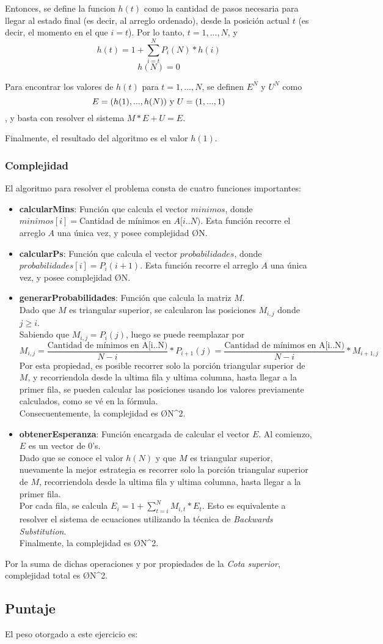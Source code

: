 Entonces, se define la funcion $h(t)$ como la cantidad de pasos necesaria para llegar al estado final (es decir, al arreglo ordenado), desde la posición actual $t$ (es decir, el momento en el que $i = t$). Por lo tanto, $t = 1,...,N$, y
\[ h(t) = 1 + \sum_{i = t}^{N} P_i(N)*h(i) \]
\[ h(N) = 0 \]

Para encontrar los valores de $h(t)$ para $t = 1,...,N$, se definen $E^N$ y $U^N$ como \[ E = (h(1),...,h(N))$ y $U = (1,...,1) \], y basta con resolver el sistema $M*E + U = E$.

Finalmente, el resultado del algoritmo es el valor $h(1)$.

\subsubsection{Complejidad}
El algoritmo para resolver el problema consta de cuatro funciones importantes:
\begin{itemize}
	\item \textbf{calcularMins}: Función que calcula el vector $minimos$, donde $minimos[i] = $Cantidad de mínimos en $A[i..N)$. Esta función recorre el arreglo $A$ una única vez, y posee complejidad \O{N}.
	\item \textbf{calcularPs}: Función que calcula el vector $probabilidades$, donde $probabilidades[i] = P_i(i+1)$. Esta función recorre el arreglo $A$ una única vez, y posee complejidad \O{N}.
	\item \textbf{generarProbabilidades}: Función que calcula la matriz $M$. \\
	Dado que $M$ es triangular superior, se calcularon las posiciones $M_{i,j}$ donde $j \geq i$. \\
	Sabiendo que $M_{i,j} = P_i(j)$, luego se puede reemplazar por \[ M_{i,j} = \frac{\text{Cantidad de mínimos en A[i..N)}}{N-i} * P_{i+1}(j) = \frac{\text{Cantidad de mínimos en A[i..N)}}{N-i} * M_{i+1,j} \]
	Por esta propiedad, es posible recorrer solo la porción triangular superior de $M$, y recorriendola desde la ultima fila y ultima columna, hasta llegar a la primer fila, se pueden calcular las posiciones usando los valores previamente calculados, como se vé en la fórmula.\\
	Consecuentemente, la complejidad es \O{N^2}.
	\item \textbf{obtenerEsperanza}: Función encargada de calcular el vector $E$. Al comienzo, $E$ es un vector de $0$'s. \\
	Dado que se conoce el valor $h(N)$ y que $M$ es triangular superior, nuevamente la mejor estrategia es recorrer solo la porción triangular superior de $M$, recorriendola desde la ultima fila y ultima columna, hasta llegar a la primer fila.\\
	Por cada fila, se calcula $E_i = 1 + \sum_{t = i}^{N} M_{i,t}*E_{t}$. Esto es equivalente a resolver el sistema de ecuaciones utilizando la técnica de \emph{Backwards Substitution}\textsuperscript{\cite{backsust}}.\\
	Finalmente, la complejidad es \O{N^2}.
\end{itemize}

\noindent Por la suma de dichas operaciones y por propiedades de la \emph{Cota superior}, \la complejidad total es \O{N^2}.

\subsection{Puntaje}
El peso otorgado a este ejercicio es:
